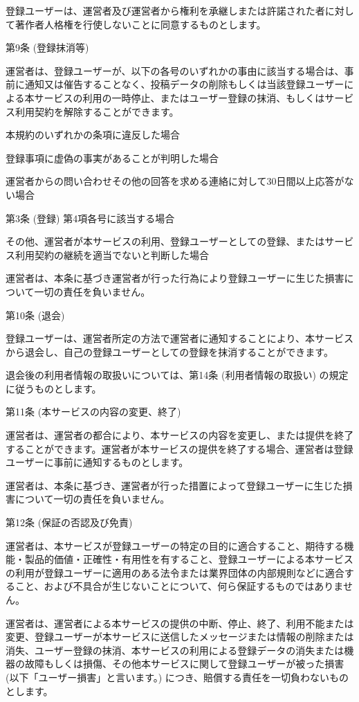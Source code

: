     登録ユーザーは、運営者及び運営者から権利を承継しまたは許諾された者に対して著作者人格権を行使しないことに同意するものとします。

第9条 (登録抹消等)

    運営者は、登録ユーザーが、以下の各号のいずれかの事由に該当する場合は、事前に通知又は催告することなく、投稿データの削除もしくは当該登録ユーザーによる本サービスの利用の一時停止、またはユーザー登録の抹消、もしくはサービス利用契約を解除することができます。

        本規約のいずれかの条項に違反した場合

        登録事項に虚偽の事実があることが判明した場合

        運営者からの問い合わせその他の回答を求める連絡に対して30日間以上応答がない場合

        第3条 (登録) 第4項各号に該当する場合

        その他、運営者が本サービスの利用、登録ユーザーとしての登録、またはサービス利用契約の継続を適当でないと判断した場合

    運営者は、本条に基づき運営者が行った行為により登録ユーザーに生じた損害について一切の責任を負いません。

第10条 (退会)

    登録ユーザーは、運営者所定の方法で運営者に通知することにより、本サービスから退会し、自己の登録ユーザーとしての登録を抹消することができます。

    退会後の利用者情報の取扱いについては、第14条 (利用者情報の取扱い) の規定に従うものとします。

第11条 (本サービスの内容の変更、終了)

    運営者は、運営者の都合により、本サービスの内容を変更し、または提供を終了することができます。運営者が本サービスの提供を終了する場合、運営者は登録ユーザーに事前に通知するものとします。

    運営者は、本条に基づき、運営者が行った措置によって登録ユーザーに生じた損害について一切の責任を負いません。

第12条 (保証の否認及び免責)

    運営者は、本サービスが登録ユーザーの特定の目的に適合すること、期待する機能・製品的価値・正確性・有用性を有すること、登録ユーザーによる本サービスの利用が登録ユーザーに適用のある法令または業界団体の内部規則などに適合すること、および不具合が生じないことについて、何ら保証するものではありません。

    運営者は、運営者による本サービスの提供の中断、停止、終了、利用不能または変更、登録ユーザーが本サービスに送信したメッセージまたは情報の削除または消失、ユーザー登録の抹消、本サービスの利用による登録データの消失または機器の故障もしくは損傷、その他本サービスに関して登録ユーザーが被った損害 (以下「ユーザー損害」と言います。) につき、賠償する責任を一切負わないものとします。

